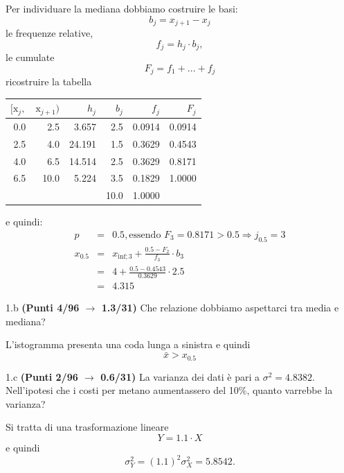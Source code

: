 \documentclass[
  11pt,
]{book}
\theoremstyle{mytheoremstyle}
\theoremstyle{mydefstyle}
\newenvironment{sol}
  {
  \begin{tcolorbox}[enhanced,breakable,arc=0.1mm,boxrule=1pt,colback=white,colframe=iblue,
  title=\bf \fontfamily{lmss}\selectfont \hspace{.5 cm} Soluzione,drop fuzzy shadow]

}{
\end{tcolorbox}
  }
\begin{document}
\begin{sol}

Per individuare la mediana dobbiamo costruire le basi:
\[
b_j=x_{j+1}-x_{j}
\]
le frequenze relative,
\[
f_j=h_j\cdot b_j,
\]
le cumulate
\[
F_j=f_1+...+f_j
\]
ricostruire la tabella

\begin{table}[H]
\centering
\begin{tabular}{rrrrrr}
\toprule
$[\text{x}_j,$ & $\text{x}_{j+1})$ & $h_j$ & $b_j$ & $f_j$ & $F_j$\\
\midrule
0.0 & 2.5 & 3.657 & 2.5 & 0.0914 & 0.0914\\
2.5 & 4.0 & 24.191 & 1.5 & 0.3629 & 0.4543\\
4.0 & 6.5 & 14.514 & 2.5 & 0.3629 & 0.8171\\
6.5 & 10.0 & 5.224 & 3.5 & 0.1829 & 1.0000\\
 &  &  & 10.0 & 1.0000 & \\
\bottomrule
\end{tabular}
\end{table}

e quindi:
\begin{eqnarray*}
  p &=&  0.5 , \text{essendo }F_{ 3 }= 0.8171  > 0.5  \Rightarrow j_{ 0.5 }= 3 \\
  x_{ 0.5 } &=& x_{\text{inf}; 3 } + \frac{ { 0.5 } - F_{ 2 }} {f_{ 3 }} \cdot b_{ 3 } \\
            &=&  4  + \frac {{ 0.5 } -  0.4543 } { 0.3629 } \cdot  2.5  \\
            &=&  4.315 
\end{eqnarray*}

\end{sol}

1.b \textbf{(Punti 4/96 \(\rightarrow\) 1.3/31)} Che relazione dobbiamo aspettarci tra media e mediana?

\begin{sol}
L'istogramma presenta una coda lunga a sinistra e quindi
\[
\bar x > x_{0.5}
\]

\end{sol}

1.c \textbf{(Punti 2/96 \(\rightarrow\) 0.6/31)} La varianza dei dati è pari a \(\sigma^2=4.8382\). Nell'ipotesi che i costi per metano aumentassero del 10\%, quanto varrebbe la varianza?

\begin{sol}
Si tratta di una trasformazione lineare
\[
Y = 1.1\cdot X
\]
e quindi
\[
\sigma_Y^2=(1.1)^2\sigma_X^2=5.8542.
\]

\end{sol}
\end{document}
